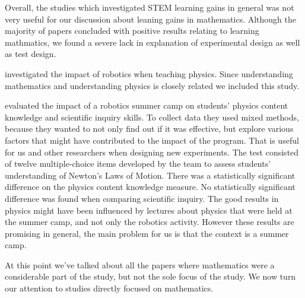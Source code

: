 \bigskip\noindent
Overall, the studies which investigated STEM learning gains in general was not very useful for our discussion about leaning gains in mathematics. 
Although the majority of papers concluded with positive results relating to learning mathmatics, we found a severe lack in explanation of experimental design as well as test design. 


\bigskip\noindent
{} investigated the impact of robotics when teaching physics. Since understanding mathematics and understanding physics is closely related we included this study. 

\bigskip\noindent
{} evaluated the impact of a robotics summer camp on students' physics content knowledge and scientific inquiry skills. To collect data they used mixed methods, because they wanted to not only find out if it was effective, but explore various factors that might have contributed to the impact of the program. That is useful for us and other researchers when designing new experiments. The test consisted of twelve multiple-choice items developed by the team to assess students' understanding of Newton's Laws of Motion. There was a statistically significant difference on the physics content knowledge measure. No statistically significant difference was found when comparing scientific inquiry. The good results in physics might have been influenced by lectures about physics that were held at the summer camp, and not only the robotics activity. However these results are promising in general, the main problem for us is that the context is a summer camp.\cite{williams2007acquisition}

\bigskip\noindent
At this point we've talked about all the papers where mathematics were a considerable part of the study, but not the sole focus of the study. We now turn our attention to studies directly focused on mathematics. 

